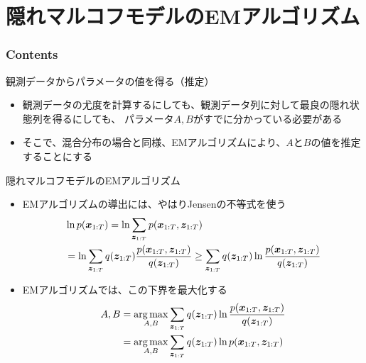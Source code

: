 \documentclass[aspectratio=169,unicode,dvipdfmx,14pt]{beamer}
\begin{document}
\section{隠れマルコフモデルのEMアルゴリズム}

\begin{frame}\frametitle{Contents}
\Large \tableofcontents[currentsection]
\end{frame}

\begin{frame}{観測データからパラメータの値を得る（推定）}
\begin{itemize}
\item 観測データの尤度を計算するにしても、観測データ列に対して最良の隠れ状態列を得るにしても、
パラメータ$A, B$がすでに分かっている必要がある
\item そこで、混合分布の場合と同様、EMアルゴリズムにより、$A$と$B$の値を推定することにする
\end{itemize}
\end{frame}


\begin{frame}{隠れマルコフモデルのEMアルゴリズム}
\begin{itemize}
\item EMアルゴリズムの導出には、やはりJensenの不等式を使う
\vspace{-.1in}
\begin{align}
& \ln p(\bm{x}_{1:T}) = \ln \sum_{\bm{z}_{1:T}} p(\bm{x}_{1:T}, \bm{z}_{1:T})
\notag \\ &
= \ln \sum_{\bm{z}_{1:T}} q(\bm{z}_{1:T}) \frac{ p(\bm{x}_{1:T}, \bm{z}_{1:T}) }{ q(\bm{z}_{1:T}) }
\geq \sum_{\bm{z}_{1:T}} q(\bm{z}_{1:T}) \ln \frac{ p(\bm{x}_{1:T}, \bm{z}_{1:T}) }{ q(\bm{z}_{1:T}) }
\end{align}
\vspace{-.5in}
\item EMアルゴリズムでは、この下界を最大化する
\begin{align}
A,B & = \operatorname*{arg\,max}_{A,B} \sum_{\bm{z}_{1:T}} q(\bm{z}_{1:T}) \ln \frac{ p(\bm{x}_{1:T}, \bm{z}_{1:T}) }{ q(\bm{z}_{1:T}) }
\notag \\ &
= \operatorname*{arg\,max}_{A,B} \sum_{\bm{z}_{1:T}} q(\bm{z}_{1:T}) \ln p(\bm{x}_{1:T}, \bm{z}_{1:T})
\end{align}
\end{itemize}
\end{frame}
\end{document}

